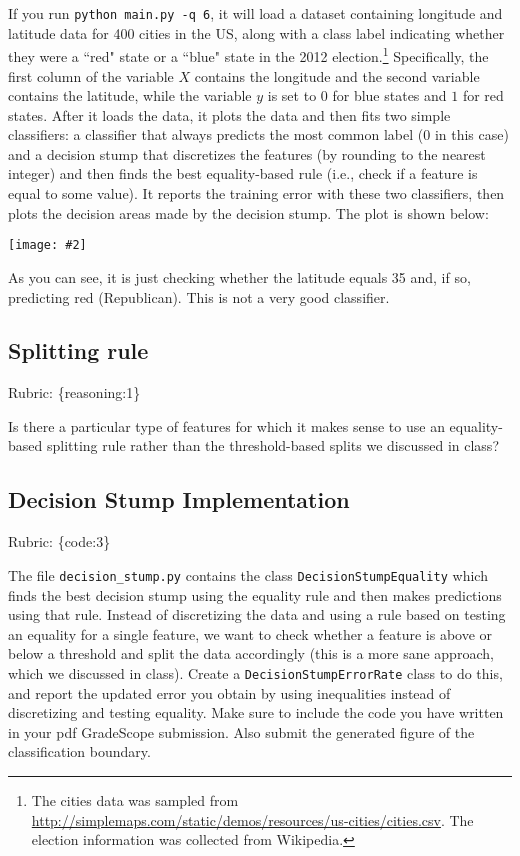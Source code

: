 \documentclass{article}
\def\rubric#1{\gre{Rubric: \{#1\}}}{}
\def\blu#1{{\color{blu}#1}}
\def\gre#1{{\color{gre}#1}}
\newcommand{\centerfig}[2]{\begin{center}\texttt{[image: \#2]}\end{center}}
\begin{document}
If you run \texttt{python main.py -q 6}, it will load a dataset containing longitude 
and latitude data for 400 cities in the US, along with a class label indicating
 whether they were a ``red" state or a ``blue" state in the 2012 
 election.\footnote{The cities data was sampled from \url{http://simplemaps.com/static/demos/resources/us-cities/cities.csv}. The election information was collected from Wikipedia.}
Specifically, the first column of the variable $X$ contains the 
longitude and the second variable contains the latitude,
while the variable $y$ is set to $0$ for blue states and $1$ for red states.
After it loads the data, it plots the data and then fits two simple 
classifiers: a classifier that always predicts the
most common label ($0$ in this case) and a decision stump
that discretizes the features (by rounding to the nearest integer)
and then finds the best equality-based rule (i.e., check
 if a feature is equal to some value).
It reports the training error with these two classifiers, then plots the decision areas made by the decision stump.
The plot is shown below:

\centerfig{0.7}{../figs/q6_decisionBoundary}

As you can see, it is just checking whether the latitude equals 35 and, if so, predicting red (Republican).
This is not a very good classifier. 

\subsection{Splitting rule}
\rubric{reasoning:1}

Is there a particular type of features for which it makes sense to use an equality-based splitting rule rather than the threshold-based splits we discussed in class?

\subsection{Decision Stump Implementation}
\rubric{code:3}

The file \texttt{decision\string_stump.py} contains the class \texttt{DecisionStumpEquality} which 
finds the best decision stump using the equality rule and then makes predictions using that
rule. Instead of discretizing the data and using a rule based on testing an equality for 
a single feature, we want to check whether a feature is above or below a threshold and 
split the data accordingly (this is a more sane approach, which we discussed in class). 
\blu{Create a \texttt{DecisionStumpErrorRate} class to do this, and report the updated error you 
obtain by using inequalities instead of discretizing and testing equality. Make sure to include the code you have written in your pdf GradeScope submission. Also submit the generated figure of the classification boundary.}
\end{document}
